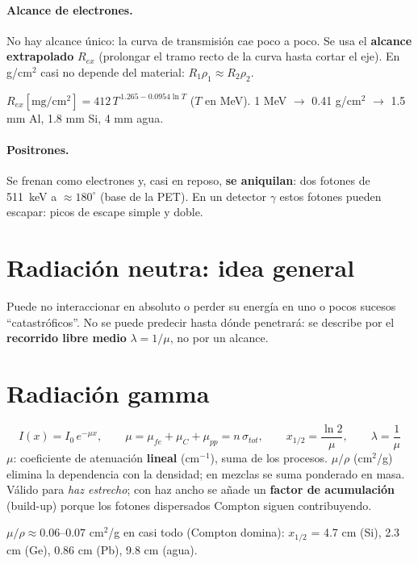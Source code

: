 \paragraph{Alcance de electrones.} No hay alcance único: la curva de transmisión cae poco a poco.
Se usa el \textbf{alcance extrapolado} $R_{ex}$ (prolongar el tramo recto de la curva hasta cortar el eje).
En g/cm$^2$ casi no depende del material: $R_1\rho_1\approx R_2\rho_2$.
\begin{dato}
$R_{ex}[\mathrm{mg/cm^2}]=412\,T^{\,1.265-0.0954\ln T}$ ($T$ en MeV). 1 MeV $\to$ 0.41 g/cm$^2$ $\to$ 1.5 mm Al, 1.8 mm Si, 4 mm agua.
\end{dato}

\paragraph{Positrones.} Se frenan como electrones y, casi en reposo, \textbf{se aniquilan}: dos fotones
de \SI{511}{keV} a $\approx180^\circ$ (base de la PET). En un detector $\gamma$ estos fotones pueden
escapar: picos de escape simple y doble.

\section{Radiación neutra: idea general}
Puede no interaccionar en absoluto o perder su energía en uno o pocos sucesos ``catastróficos''.
No se puede predecir hasta dónde penetrará: se describe por el \textbf{recorrido libre medio}
$\lambda=1/\mu$, no por un alcance.

\section{Radiación gamma}
\begin{clave}
\[
I(x)=I_0\,e^{-\mu x},\qquad \mu=\mu_{fe}+\mu_{C}+\mu_{pp}=n\,\sigma_{tot},\qquad x_{1/2}=\frac{\ln2}{\mu},\qquad \lambda=\frac1\mu
\]
$\mu$: coeficiente de atenuación \textbf{lineal} (cm$^{-1}$), suma de los procesos. $\mu/\rho$ (cm$^2$/g)
elimina la dependencia con la densidad; en mezclas se suma ponderado en masa. Válido para
\emph{haz estrecho}; con haz ancho se añade un \textbf{factor de acumulación} (build-up) porque los
fotones dispersados Compton siguen contribuyendo.
\end{clave}

\begin{dato}
$\mu/\rho\approx0.06$--$0.07$ cm$^2$/g en casi todo (Compton domina): $x_{1/2}$ = 4.7 cm (Si), 2.3 cm (Ge), 0.86 cm (Pb), 9.8 cm (agua).
\end{dato}

